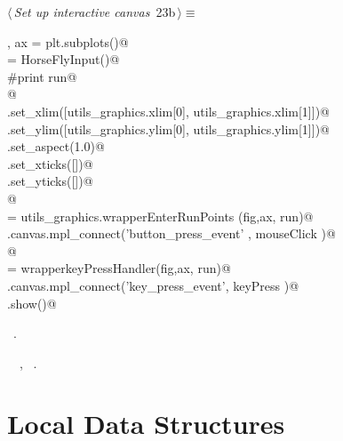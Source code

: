 \documentclass[11.5pt]{report}
\begin{document}
\begin{flushleft} \small\label{scrap17}\raggedright\small
{} $\langle\,${\itshape Set up interactive canvas}\nobreak\ {\footnotesize {23b}}$\,\rangle\equiv$
\vspace{-1ex}
\begin{list}{}{} \item
\mbox{}\verb@fig, ax =  plt.subplots()@\\
\mbox{}\verb@run = HorseFlyInput()@\\
\mbox{}\verb@#print run@\\
\mbox{}\verb@    @\\
\mbox{}\verb@ax.set_xlim([utils_graphics.xlim[0], utils_graphics.xlim[1]])@\\
\mbox{}\verb@ax.set_ylim([utils_graphics.ylim[0], utils_graphics.ylim[1]])@\\
\mbox{}\verb@ax.set_aspect(1.0)@\\
\mbox{}\verb@ax.set_xticks([])@\\
\mbox{}\verb@ax.set_yticks([])@\\
\mbox{}\verb@      @\\
\mbox{}\verb@mouseClick   = utils_graphics.wrapperEnterRunPoints (fig,ax, run)@\\
\mbox{}\verb@fig.canvas.mpl_connect('button_press_event' , mouseClick )@\\
\mbox{}\verb@      @\\
\mbox{}\verb@keyPress     = wrapperkeyPressHandler(fig,ax, run)@\\
\mbox{}\verb@fig.canvas.mpl_connect('key_press_event', keyPress   )@\\
\mbox{}\verb@plt.show()@\\
\mbox{}\verb@@{\NWsep}
\end{list}
\vspace{-1.5ex}
\footnotesize
\begin{list}{}{\setlength{\itemsep}{-\parsep}\setlength{\itemindent}{-\leftmargin}}
\item \NWtxtMacroRefIn\ .
\item \NWtxtIdentsUsed\nobreak\  \verb@HorseFlyInput@\nobreak\ , \verb@wrapperkeyPressHandler@\nobreak\ .
\item{}
\end{list}
\vspace{4ex}
\end{flushleft}
\section{Local Data Structures}
\end{document}
